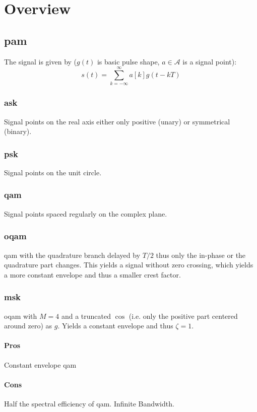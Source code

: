 \chapter{Overview}
\section{\acl{pam}}
The signal is given by ($g(t)$ is basic pulse shape, $a \in \mathcal{A}$ is a signal
point):
\begin{equation}
    s(t) = \sum_{k=-\infty}^\infty a[k] g(t-kT)
\end{equation}

\subsection{\acl{ask}}
Signal points on the real axis either only positive (unary) or symmetrical (binary).

\subsection{\acl{psk}}
Signal points on the unit circle.

\subsection{\acl{qam}}
Signal points spaced regularly on the complex plane.

\subsection{\acl{oqam}}
\ac{qam} with the quadrature branch delayed by $T/2$ thus only the in-phase or the
quadrature part changes. This yields a signal without zero crossing, which yields a
more constant envelope and thus a smaller crest factor.

\subsection{\acl{msk}}
\ac{oqam} with $M=4$ and a truncated $\cos$ (i.e. only the positive part centered around
zero) as $g$. Yields a constant envelope and thus $\zeta=1$.

\subsubsection{Pros}
Constant envelope \ac{qam}

\subsubsection{Cons}
Half the spectral efficiency of \ac{qam}. Infinite Bandwidth.

